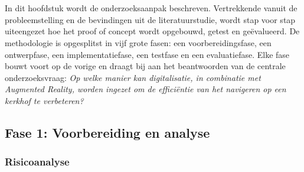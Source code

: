 
\chapter{}%
\label{ch:methodologie}


In dit hoofdstuk wordt de onderzoeksaanpak beschreven. Vertrekkende vanuit de probleemstelling en de bevindingen uit de literatuurstudie, wordt stap voor stap uiteengezet hoe het proof of concept wordt opgebouwd, getest en geëvalueerd. De methodologie is opgesplitst in vijf grote fasen: een voorbereidingsfase, een ontwerpfase, een implementatiefase, een testfase en een evaluatiefase. Elke fase bouwt voort op de vorige en draagt bij aan het beantwoorden van de centrale onderzoeksvraag: \textit{Op welke manier kan digitalisatie, in combinatie met Augmented Reality, worden ingezet om de efficiëntie van het navigeren op een kerkhof te verbeteren?}

\section{Fase 1: Voorbereiding en analyse}

\subsection{Risicoanalyse}

